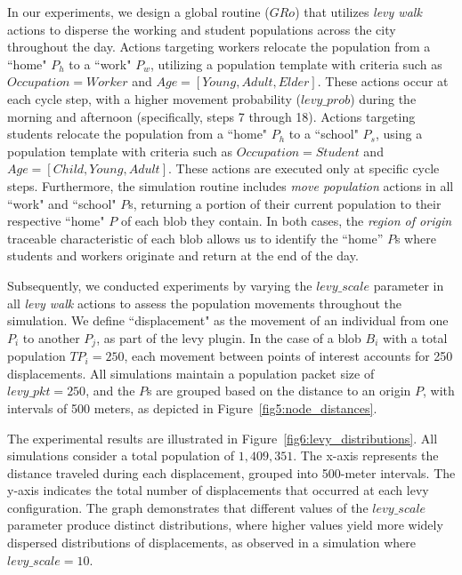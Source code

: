 In our experiments, we design a global routine ($GRo$) that utilizes \textit{levy walk} actions to disperse the working and student populations across the city throughout the day. Actions targeting workers relocate the population from a ``home" $P_h$ to a ``work" $P_w$, utilizing a population template with criteria such as $Occupation = Worker$ and $Age = [Young, Adult, Elder]$. These actions occur at each cycle step, with a higher movement probability ($levy\_prob$) during the morning and afternoon (specifically, steps 7 through 18).
Actions targeting students relocate the population from a ``home" $P_h$ to a ``school" $P_s$, using a population template with criteria such as $Occupation = Student$ and $Age = [Child, Young, Adult]$. These actions are executed only at specific cycle steps. Furthermore, the simulation routine includes \textit{move population} actions in all ``work" and ``school" $P$s, returning a portion of their current population to their respective ``home" $P$ of each blob they contain. In both cases, the \textit{region of origin} traceable characteristic of each blob allows us to identify the ``home'' $P$s where students and workers originate and return at the end of the day.

Subsequently, we conducted experiments by varying the $levy\_scale$ parameter in all \textit{levy walk} actions to assess the population movements throughout the simulation. We define ``displacement" as the movement of an individual from one $P_i$ to another $P_j$, as part of the levy plugin.
In the case of a blob $B_i$ with a total population $TP_i = 250$, each movement between points of interest accounts for 250 displacements. All simulations maintain a population packet size of $levy\_pkt = 250$, and the $P$s are grouped based on the distance to an origin $P$, with intervals of 500 meters, as depicted in Figure~\ref{fig5:node_distances}.

The experimental results are illustrated in Figure~\ref{fig6:levy_distributions}. All simulations consider a total population of $1,409,351$. The x-axis represents the distance traveled during each displacement, grouped into 500-meter intervals.
The y-axis indicates the total number of displacements that occurred at each levy configuration. The graph demonstrates that different values of the $levy\_scale$ parameter produce distinct distributions, where higher values yield more widely dispersed distributions of displacements, as observed in a simulation where $levy\_scale = 10$.

